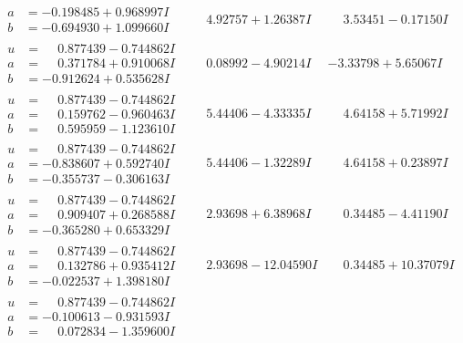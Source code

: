 \documentclass[1p]{elsarticle_modified}
\theoremstyle{definition}
\begin{document}
$$\begin{array}{c|c|c}
\begin{aligned}
a &= -0.198485 + 0.968997 I \\
b &= -0.694930 + 1.099660 I\end{aligned}
 & \phantom{-}4.92757 + 1.26387 I & \phantom{-}3.53451 - 0.17150 I \\ \hline\begin{aligned}
u &= \phantom{-}0.877439 - 0.744862 I \\
a &= \phantom{-}0.371784 + 0.910068 I \\
b &= -0.912624 + 0.535628 I\end{aligned}
 & \phantom{-}0.08992 - 4.90214 I & -3.33798 + 5.65067 I \\ \hline\begin{aligned}
u &= \phantom{-}0.877439 - 0.744862 I \\
a &= \phantom{-}0.159762 - 0.960463 I \\
b &= \phantom{-}0.595959 - 1.123610 I\end{aligned}
 & \phantom{-}5.44406 - 4.33335 I & \phantom{-}4.64158 + 5.71992 I \\ \hline\begin{aligned}
u &= \phantom{-}0.877439 - 0.744862 I \\
a &= -0.838607 + 0.592740 I \\
b &= -0.355737 - 0.306163 I\end{aligned}
 & \phantom{-}5.44406 - 1.32289 I & \phantom{-}4.64158 + 0.23897 I \\ \hline\begin{aligned}
u &= \phantom{-}0.877439 - 0.744862 I \\
a &= \phantom{-}0.909407 + 0.268588 I \\
b &= -0.365280 + 0.653329 I\end{aligned}
 & \phantom{-}2.93698 + 6.38968 I & \phantom{-}0.34485 - 4.41190 I \\ \hline\begin{aligned}
u &= \phantom{-}0.877439 - 0.744862 I \\
a &= \phantom{-}0.132786 + 0.935412 I \\
b &= -0.022537 + 1.398180 I\end{aligned}
 & \phantom{-}2.93698 - 12.04590 I & \phantom{-}0.34485 + 10.37079 I \\ \hline\begin{aligned}
u &= \phantom{-}0.877439 - 0.744862 I \\
a &= -0.100613 - 0.931593 I \\
b &= \phantom{-}0.072834 - 1.359600 I\end{aligned}

\end{array}$$
\end{document}
